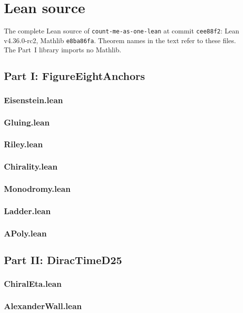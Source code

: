 \documentclass[11pt]{article}
\theoremstyle{definition}
\begin{document}
\appendix
\section{Lean source}
The complete Lean source of \texttt{count-me-as-one-lean} at commit \texttt{cee88f2}: Lean v4.36.0-rc2, Mathlib \texttt{e8ba86fa}. Theorem names in the text refer to these files. The Part~I library imports no Mathlib.
\subsection*{Part I: FigureEightAnchors}
\subsubsection*{Eisenstein.lean}
\subsubsection*{Gluing.lean}
\subsubsection*{Riley.lean}
\subsubsection*{Chirality.lean}
\subsubsection*{Monodromy.lean}
\subsubsection*{Ladder.lean}
\subsubsection*{APoly.lean}
\subsection*{Part II: DiracTimeD25}
\subsubsection*{ChiralEta.lean}
\subsubsection*{AlexanderWall.lean}
\end{document}
